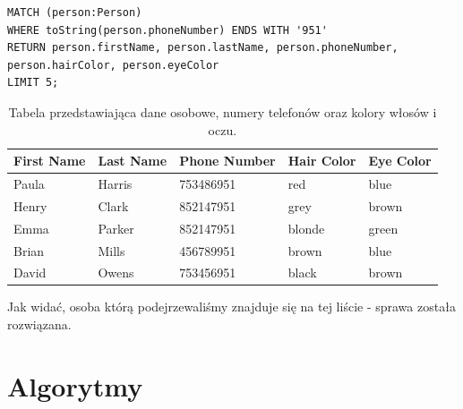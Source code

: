 \documentclass[a4paper,12pt]{article}
\begin{document}
\begin{center}
\begin{minipage}{0.8\linewidth}
\begin{lstlisting}[language=Cypher, basicstyle=\small, breaklines=true]
MATCH (person:Person)
WHERE toString(person.phoneNumber) ENDS WITH '951'
RETURN person.firstName, person.lastName, person.phoneNumber, person.hairColor, person.eyeColor
LIMIT 5;
\end{lstlisting}
\end{minipage}
\end{center}
\newpage
\begin{table}[h!]
\centering
\begin{tabular}{|l|l|l|l|l|}
\hline
\textbf{First Name} & \textbf{Last Name} & \textbf{Phone Number} & \textbf{Hair Color} & \textbf{Eye Color} \\ \hline
Paula              & Harris             & 753486951             & red                 & blue               \\ \hline
Henry              & Clark              & 852147951             & grey                & brown              \\ \hline
Emma               & Parker             & 852147951             & blonde              & green              \\ \hline
Brian              & Mills              & 456789951             & brown               & blue               \\ \hline
David              & Owens              & 753456951             & black               & brown              \\ \hline
\end{tabular}
\caption{Tabela przedstawiająca dane osobowe, numery telefonów oraz kolory włosów i oczu.}
\label{tab:person_data}
\end{table}

Jak widać, osoba którą podejrzewaliśmy znajduje się na tej liście - sprawa została rozwiązana.

\section{Algorytmy}
\end{document}
